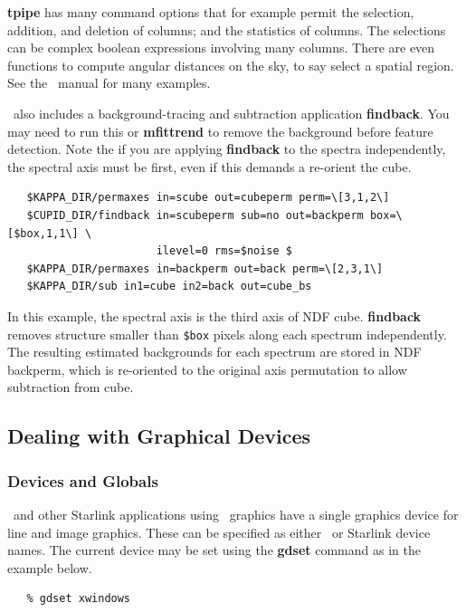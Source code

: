 \documentclass[twoside,11pt]{article}
\newcommand{\xref}[3]{#1}
\newcommand{\xlabel}[1]{}
\begin{document}
{{\bf tpipe} has many command options that for example permit the
selection, addition, and deletion of columns; and the statistics of
columns.  The selections can be complex boolean expressions involving
many columns.  There are even functions to compute angular distances on
the sky, to say select a spatial region.  See the \STILTS\ manual for
many examples.

\CUPID\ also includes a background-tracing and subtraction application \xref{{\bf
findback}}{sun255}{FINDBACK}.  You may need to run this or \xref{{\bf
mfittrend}}{sun95}{MFITTREND} to remove the background before feature
detection.  Note the if you are applying {\bf findback} to the spectra
independently, the spectral axis must be first, even if this demands a 
re-orient the cube.

\begin{verbatim}
   $KAPPA_DIR/permaxes in=scube out=cubeperm perm=\[3,1,2\]
   $CUPID_DIR/findback in=scubeperm sub=no out=backperm box=\[$box,1,1\] \
                       ilevel=0 rms=$noise $
   $KAPPA_DIR/permaxes in=backperm out=back perm=\[2,3,1\]
   $KAPPA_DIR/sub in1=cube in2=back out=cube_bs
\end{verbatim}

In this example, the spectral axis is the third axis of NDF cube. {\bf
findback} removes structure smaller than {\tt \$box} pixels along each
spectrum independently.  The resulting estimated backgrounds for each
spectrum are stored in NDF backperm, which is re-oriented to the
original axis permutation to allow subtraction from cube.

\subsection{\label{sc16_graphics}Dealing with Graphical Devices\xlabel{sc16_graphics}}

\subsubsection{Devices and Globals}

\KAPPAref\ and other Starlink applications using \PGPLOTref\ graphics
have a single \xref{graphics device}{sun95}{se_graphdev} for line and
image graphics.  These can be specified as either \xref{\PGPLOT\ or
Starlink device names}{sun95}{se_selgradev}.  The current device may
be set using the \xref{{\bf gdset}}{sun95}{GDSET} command as in the example
below.

\small\begin{verbatim}
   % gdset xwindows
\end{verbatim}\normalsize

}
\end{document}
